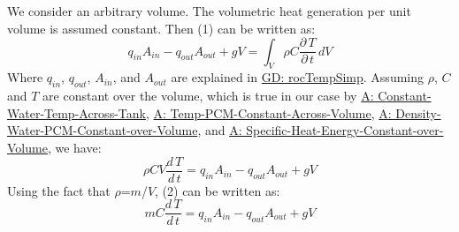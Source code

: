 \documentclass[12pt]{article}
\begin{document}
We consider an arbitrary volume. The volumetric heat generation per unit volume is assumed constant. Then (1) can be written as:
\begin{dmath}
{q_{in}} {A_{in}}-{q_{out}} {A_{out}}+g V=\int_{V}{ρ C \frac{\partial{}\,T}{\partial{}\,t}}\,dV
\end{dmath}
Where ${q_{in}}$, ${q_{out}}$, ${A_{in}}$, and ${A_{out}}$ are explained in \hyperref[GD:rocTempSimp]{GD: rocTempSimp}. Assuming $ρ$, $C$ and $T$ are constant over the volume, which is true in our case by \hyperref[A:Constant-Water-Temp-Across-Tank]{A: Constant-Water-Temp-Across-Tank}, \hyperref[A:Temp-PCM-Constant-Across-Volume]{A: Temp-PCM-Constant-Across-Volume}, \hyperref[A:Density-Water-PCM-Constant-over-Volume]{A: Density-Water-PCM-Constant-over-Volume}, and \hyperref[A:Specific-Heat-Energy-Constant-over-Volume]{A: Specific-Heat-Energy-Constant-over-Volume}, we have:
\begin{dmath}
ρ C V \frac{d\,T}{d\,t}={q_{in}} {A_{in}}-{q_{out}} {A_{out}}+g V
\end{dmath}
Using the fact that $ρ$=$m$/$V$, (2) can be written as:
\begin{dmath}
m C \frac{d\,T}{d\,t}={q_{in}} {A_{in}}-{q_{out}} {A_{out}}+g V
\end{dmath}
\end{document}
